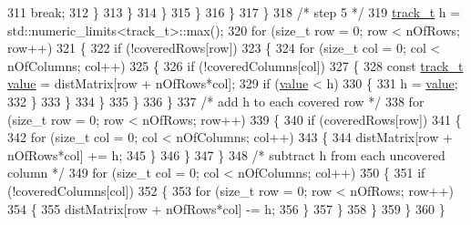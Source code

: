\begin{DoxyCode}
311                                 \textcolor{keywordflow}{break};
312                             \}
313                         \}
314                     \}
315                 \}
316             \}
317         \}
318         \textcolor{comment}{/* step 5 */}
319         \mbox{\hyperlink{defines_8h_a7ce9c8817b42ab418e61756f579549ab}{track\_t}} h = std::numeric\_limits<track\_t>::max();
320         \textcolor{keywordflow}{for} (\textcolor{keywordtype}{size\_t} row = 0; row < nOfRows; row++)
321         \{
322             \textcolor{keywordflow}{if} (!coveredRows[row])
323             \{
324                 \textcolor{keywordflow}{for} (\textcolor{keywordtype}{size\_t} col = 0; col < nOfColumns; col++)
325                 \{
326                     \textcolor{keywordflow}{if} (!coveredColumns[col])
327                     \{
328                         \textcolor{keyword}{const} \mbox{\hyperlink{defines_8h_a7ce9c8817b42ab418e61756f579549ab}{track\_t}} \mbox{\hyperlink{struct_g_m_l__token_a50b20988e3fe419332313e8d9e02c775}{value}} = distMatrix[row + nOfRows*col];
329                         \textcolor{keywordflow}{if} (\mbox{\hyperlink{struct_g_m_l__token_a50b20988e3fe419332313e8d9e02c775}{value}} < h)
330                         \{
331                             h = \mbox{\hyperlink{struct_g_m_l__token_a50b20988e3fe419332313e8d9e02c775}{value}};
332                         \}
333                     \}
334                 \}
335             \}
336         \}
337         \textcolor{comment}{/* add h to each covered row */}
338         \textcolor{keywordflow}{for} (\textcolor{keywordtype}{size\_t} row = 0; row < nOfRows; row++)
339         \{
340             \textcolor{keywordflow}{if} (coveredRows[row])
341             \{
342                 \textcolor{keywordflow}{for} (\textcolor{keywordtype}{size\_t} col = 0; col < nOfColumns; col++)
343                 \{
344                     distMatrix[row + nOfRows*col] += h;
345                 \}
346             \}
347         \}
348         \textcolor{comment}{/* subtract h from each uncovered column */}
349         \textcolor{keywordflow}{for} (\textcolor{keywordtype}{size\_t} col = 0; col < nOfColumns; col++)
350         \{
351             \textcolor{keywordflow}{if} (!coveredColumns[col])
352             \{
353                 \textcolor{keywordflow}{for} (\textcolor{keywordtype}{size\_t} row = 0; row < nOfRows; row++)
354                 \{
355                     distMatrix[row + nOfRows*col] -= h;
356                 \}
357             \}
358         \}
359     \}
360 \}
\end{DoxyCode}
